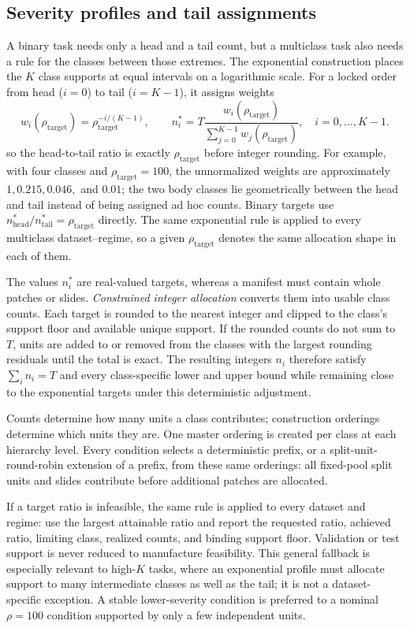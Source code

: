\documentclass[11pt]{article}
\begin{document}
\subsection{Severity profiles and tail assignments}
A binary task needs only a head and a tail count, but a multiclass task also needs a rule for the classes between those extremes. The exponential construction places the $K$ class supports at equal intervals on a logarithmic scale. For a locked order from head ($i=0$) to tail ($i=K-1$), it assigns weights
\begin{equation}
  w_i(\rho_{\mathrm{target}})=\rho_{\mathrm{target}}^{-i/(K-1)},\qquad
  n_i^*=T\frac{w_i(\rho_{\mathrm{target}})}{\sum_{j=0}^{K-1}w_j(\rho_{\mathrm{target}})},
  \quad i=0,\ldots,K-1.
  \label{eq:construction}
\end{equation}
\noindent so the head-to-tail ratio is exactly $\rho_{\mathrm{target}}$ before integer rounding. For example, with four classes and $\rho_{\mathrm{target}}=100$, the unnormalized weights are approximately $1,0.215,0.046,$ and $0.01$; the two body classes lie geometrically between the head and tail instead of being assigned ad hoc counts. Binary targets use $n_{\mathrm{head}}^*/n_{\mathrm{tail}}^*=\rho_{\mathrm{target}}$ directly. The same exponential rule is applied to every multiclass dataset--regime, so a given $\rho_{\mathrm{target}}$ denotes the same allocation shape in each of them.

The values $n_i^*$ are real-valued targets, whereas a manifest must contain whole patches or slides. \emph{Constrained integer allocation} converts them into usable class counts. Each target is rounded to the nearest integer and clipped to the class's support floor and available unique support. If the rounded counts do not sum to $T$, units are added to or removed from the classes with the largest rounding residuals until the total is exact. The resulting integers $n_i$ therefore satisfy $\sum_i n_i=T$ and every class-specific lower and upper bound while remaining close to the exponential targets under this deterministic adjustment.

Counts determine how many units a class contributes; construction orderings determine which units they are. One master ordering is created per class at each hierarchy level. Every condition selects a deterministic prefix, or a split-unit-round-robin extension of a prefix, from these same orderings: all fixed-pool split units and slides contribute before additional patches are allocated.

If a target ratio is infeasible, the same rule is applied to every dataset and regime: use the largest attainable ratio and report the requested ratio, achieved ratio, limiting class, realized counts, and binding support floor. Validation or test support is never reduced to manufacture feasibility. This general fallback is especially relevant to high-$K$ tasks, where an exponential profile must allocate support to many intermediate classes as well as the tail; it is not a dataset-specific exception. A stable lower-severity condition is preferred to a nominal $\rho=100$ condition supported by only a few independent units.
\end{document}

